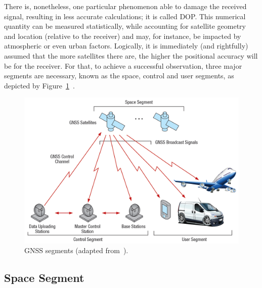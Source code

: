 There is, nonetheless, one particular phenomenon able to damage the received signal, resulting in less accurate calculations; it is called \gls{DOP}. This numerical quantity can be measured statistically, while accounting for satellite geometry and location (relative to the receiver) and may, for instance, be impacted by atmospheric or even urban factors.
Logically, it is immediately (and rightfully) assumed that the more satellites there are, the higher the positional accuracy will be for the receiver. For that, to achieve a successful observation, three major segments are necessary, known as the space, control and user segments, as depicted by Figure~\ref{fig:s_c_u_segment}~\cite{gps_USGov,novatel_gnss,ayers_geosystems_2011}.

\begin{figure}[ht]
	\centering
	\includegraphics[width=1.0\textwidth]{Chapters/Figures/s_c_u_segment.png}
	\caption{GNSS segments (adapted from~\cite{novatel_gnss}).}
	\label{fig:s_c_u_segment}
\end{figure}

\subsection{Space Segment}\label{sec:II_gnss_space_seg}

